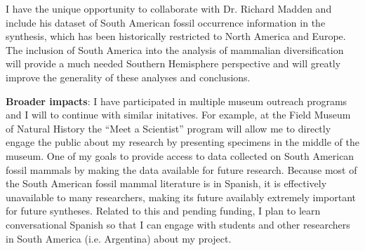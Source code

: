 \documentclass[11pt,letterpaper]{article}
\begin{document}
I have the unique opportunity to collaborate with Dr. Richard Madden and include his dataset of South American fossil occurrence information in the synthesis, which has been historically restricted to North America and Europe. The inclusion of South America into the analysis of mammalian diversification will provide a much needed Southern Hemisphere perspective and will greatly improve the generality of these analyses and conclusions. 


\textbf{Broader impacts}:
I have participated in multiple museum outreach programs and I will to continue with similar initatives. For example, at the Field Museum of Natural History the ``Meet a Scientist'' program will allow me to directly engage the public about my research by presenting specimens in the middle of the museum. One of my goals to provide access to data collected on South American fossil mammals by making the data available for future research. Because most of the South American fossil mammal literature is in Spanish, it is effectively unavailable to many researchers, making its future availably extremely important for future syntheses. Related to this and pending funding, I plan to learn conversational Spanish so that I can engage with students and other researchers in South America (i.e. Argentina) about my project. 
\end{document}
